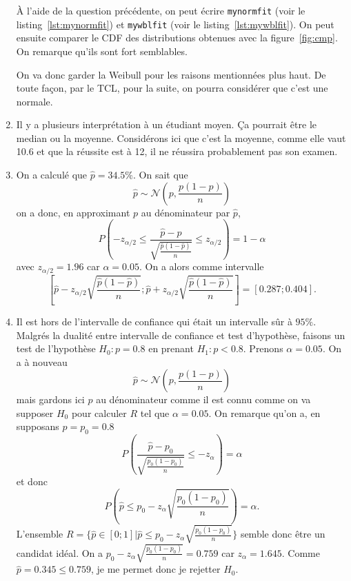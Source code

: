\begin{enumerate}
    À l'aide de la question précédente, on peut écrire
    \lstinline|mynormfit| (voir le listing~\ref{lst:mynormfit}) et
    \lstinline|mywblfit| (voir le listing~\ref{lst:mywblfit}).
    On peut ensuite comparer le CDF des distributions obtenues
    avec la figure~\ref{fig:cmp}.
    On remarque qu'ils sont fort semblables.

    On va donc garder la Weibull pour les raisons mentionnées plus haut.
    De toute façon, par le TCL, pour la suite,
    on pourra considérer que c'est une normale.
  \item
    Il y a plusieurs interprétation à un étudiant moyen.
    Ça pourrait être le median ou la moyenne.
    Considérons ici que c'est la moyenne, comme elle vaut 10.6 et que la réussite est à 12,
    il ne réussira probablement pas son examen.
  \item On a calculé que $\hat{p} = \si{34.5}{\%}$.
    On sait que
    \[ \hat{p} \sim \mathcal{N}(p,\frac{p(1-p)}{n}) \]
    on a donc, en approximant $p$ au dénominateur par $\hat{p}$,
    \[ P(-z_{\alpha/2} \leq \frac{\hat{p}-p}{\sqrt{\frac{\hat{p}(1-\hat{p})}{n}}}
    \leq z_{\alpha/2}) = 1-\alpha \]
    avec $z_{\alpha/2} = 1.96$ car $\alpha = 0.05$.
    On a alors comme intervalle
    \[ \left[\hat{p}-z_{\alpha/2}\sqrt{\frac{\hat{p}(1-\hat{p})}{n}};
    \hat{p}+z_{\alpha/2}\sqrt{\frac{\hat{p}(1-\hat{p})}{n}}\right] =
    [0.287; 0.404].
    \]
  \item
    Il est hors de l'intervalle de confiance qui était un
    intervalle sûr à $\si{95}{\%}$.
    Malgrés la dualité entre intervalle de confiance et
    test d'hypothèse,
    faisons un test de l'hypothèse $H_0: p = 0.8$
    en prenant $H_1: p < 0.8$.
    Prenons $\alpha = 0.05$.
    On a à nouveau
    \[ \hat{p} \sim \mathcal{N}(p,\frac{p(1-p)}{n}) \]
    mais gardons ici $p$ au dénominateur comme il est connu
    comme on va supposer $H_0$ pour calculer $R$ tel que
    $\alpha = 0.05$.
    On remarque qu'on a, en supposans $p = p_0 = 0.8$
    \[ P(\frac{\hat{p}-p_0}{\sqrt{\frac{p_0(1-p_0)}{n}}}
    \leq -z_{\alpha}) = \alpha \]
    et donc
    \[ P(\hat{p} \leq p_0-z_{\alpha}\sqrt{\frac{p_0(1-p_0)}{n}}) = \alpha. \]
    L'ensemble $R = \{\hat{p} \in [0;1] | \hat{p} \leq p_0-z_{\alpha}\sqrt{\frac{p_0(1-p_0)}{n}}\}$
    semble donc être un candidat idéal.
    On a $p_0-z_{\alpha}\sqrt{\frac{p_0(1-p_0)}{n}} = 0.759$
    car $z_\alpha = 1.645$.
    Comme $\hat{p} = 0.345 \leq 0.759$, je me permet donc je rejetter
    $H_0$.
\end{enumerate}
